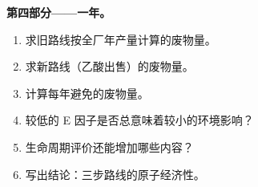 \begin{problem}
\medskip\noindent\textbf{第四部分——一年。}
\begin{enumerate}[resume]
  \item 求旧路线按全厂年产量计算的废物量。
  \item 求新路线（乙酸出售）的废物量。
  \item 计算每年避免的废物量。
  \item 较低的 E 因子是否总意味着较小的环境影响？
  \item 生命周期评价还能增加哪些内容？
  \item 写出结论：三步路线的原子经济性。
\end{enumerate}
\end{problem}
